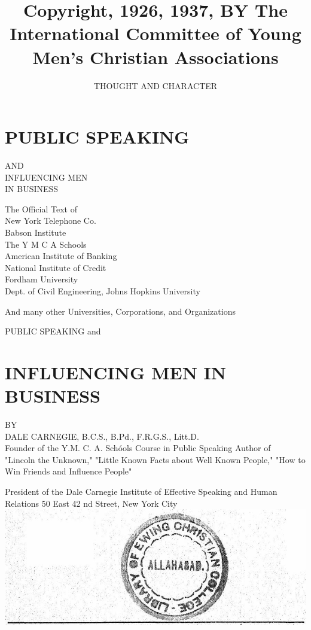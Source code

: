 \documentclass[10pt]{article}
\title{Copyright, 1926, 1937, BY The International Committee of Young Men's Christian Associations }
\author{THOUGHT AND CHARACTER}
\date{}
\begin{document}
\maketitle
\captionsetup{singlelinecheck=false}
\section*{PUBLIC SPEAKING}
AND\\
INFLUENCING MEN\\
IN BUSINESS

The Official Text of\\
New York Telephone Co.\\
Babson Institute\\
The Y M C A Schools\\
American Institute of Banking\\
National Institute of Credit\\
Fordham University\\
Dept. of Civil Engineering, Johns Hopkins University

And many other Universities, Corporations, and Organizations

PUBLIC SPEAKING and

\section*{INFLUENCING MEN IN BUSINESS}
BY\\
DALE CARNEGIE, B.C.S., B.Pd., F.R.G.S., Litt.D.\\
Founder of the Y.M. C. A. Schóols Course in Public Speaking Author of\\
"Lincoln the Unknown," "Little Known Facts about Well Known People," "How to Win Friends and Influence People"

President of the Dale Carnegie Institute of Effective Speaking and Human Relations 50 East 42 nd Street, New York City\\
\includegraphics[max width=\textwidth, center]{2025_08_23_1937dba03aa6311a046dg-003}
\end{document}
